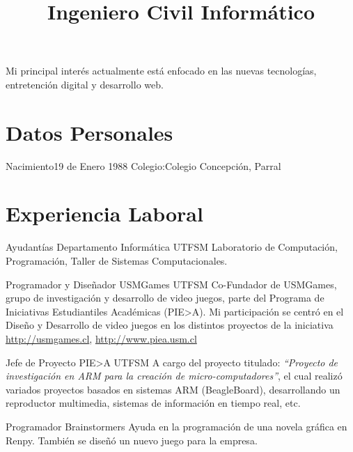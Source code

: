 \documentclass[letter,10pt]{moderncv}
\title{Ingeniero Civil Informático}               %
\begin{document}
\maketitle
\vspace{-30pt}
\begin{center}
    Mi principal interés actualmente está enfocado en las nuevas tecnologías,
    entretención digital y desarrollo web. 

 \end{center}
\section{Datos Personales}
           {Nacimiento}{19 de Enero 1988}
           {Colegio:}{Colegio Concepción, Parral}
           {}{}

\section{Experiencia Laboral}

        {Ayudantías}
        {Departamento Informática}
        {UTFSM}
        {}
        {Laboratorio de Computación, Programación, Taller de Sistemas Computacionales.}

        {Programador y Diseñador}
        {USMGames}
        {UTFSM}
        {Co-Fundador de USMGames, grupo de investigación y desarrollo de video
        juegos, parte del Programa de Iniciativas Estudiantiles Académicas (PIE>A).
        Mi participación se centró en el Diseño y Desarrollo de video juegos
        en los distintos proyectos de la iniciativa}
        {\url{http://usmgames.cl}, \url{http://www.piea.usm.cl}}

        {Jefe de Proyecto}
        {PIE>A}
        {UTFSM}
        {}
        {A cargo del proyecto titulado: \emph{``Proyecto de investigación en ARM
        para la creación de micro-computadores''}, el cual realizó variados
        proyectos basados en sistemas ARM (BeagleBoard), desarrollando un
        reproductor multimedia, sistemas de información en tiempo real, etc.}

        {Programador}
        {Brainstormers}
        {}
	{}
        {Ayuda en la programación de una novela gráfica en Renpy. También se diseñó
	un nuevo juego para la empresa.}
\end{document}
